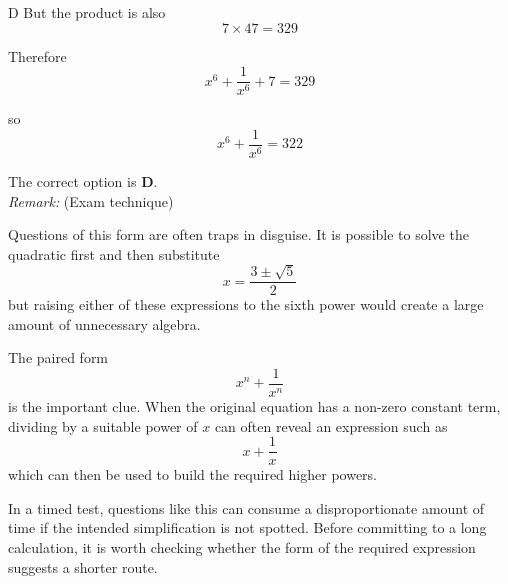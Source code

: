 \documentclass[11pt,a4paper]{article}
\begin{document}
\begin{enumerate}[label=\textbf{\arabic*.},leftmargin=*,itemsep=0pt,start=19]
\begin{djsSolution}{D}
But the product is also
\[
7\times47=329
\]

Therefore
\[
x^6+\frac{1}{x^6}+7=329
\]

so
\[
x^6+\frac{1}{x^6}=322
\]

The correct option is \textbf{D}.\\[5pt]

\textit{Remark:} (Exam technique)

Questions of this form are often traps in disguise. It is possible to solve the quadratic first and then substitute
\[
x=\frac{3\pm\sqrt5}{2}
\]
but raising either of these expressions to the sixth power would create a large amount of unnecessary algebra.

The paired form
\[
x^n+\frac{1}{x^n}
\]
is the important clue. When the original equation has a non-zero constant term, dividing by a suitable power of \(x\) can often reveal an expression such as
\[
x+\frac{1}{x}
\]
which can then be used to build the required higher powers.

In a timed test, questions like this can consume a disproportionate amount of time if the intended simplification is not spotted. Before committing to a long calculation, it is worth checking whether the form of the required expression suggests a shorter route.
\end{djsSolution}
\end{enumerate}
\clearpage
\thispagestyle{djssolutions}
\vspace*{8pt}
\end{document}

